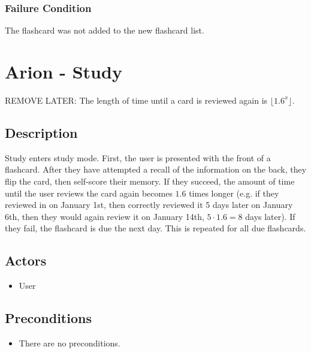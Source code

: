 \documentclass{scrreprt}
\begin{document}
    \subsection{Failure Condition}
    The flashcard was not added to the new flashcard list.

\chapter{Arion - Study}
REMOVE LATER: The length of time until a card is reviewed again is $\lfloor 1.6^x \rfloor$.

\section{Description}
Study enters study mode. First, the user is presented with the front of a flashcard.
After they have attempted a recall of the information on the back, they flip the card,
then self-score their memory. If they succeed, the amount of time until the user reviews the card
again becomes $1.6$ times longer (e.g. if they reviewed in on January 1st, then correctly reviewed
it 5 days later on January 6th, then they would again review it on January 14th, $5\cdot 1.6=8$ days later).
If they fail, the flashcard is due the next day. This is repeated for all due flashcards.

\section{Actors}
\begin{itemize}
    \item User
\end{itemize}

\section{Preconditions}
\begin{itemize}
    \item There are no preconditions.
\end{itemize}
\end{document}
